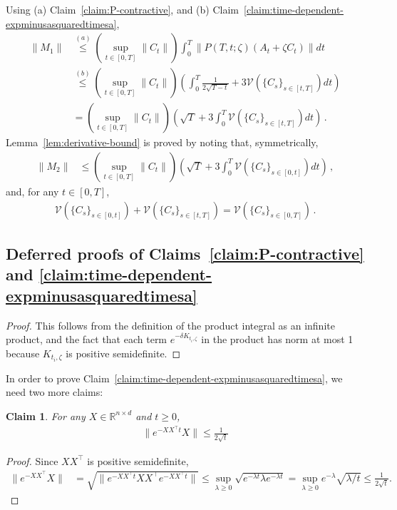 \documentclass[11pt]{article} %
\newcommand{\R}{\mathbb{R}}
\newcommand{\<}{\langle}
\renewcommand{\>}{\rangle}
\newtheorem{claim}{Claim}
\def\cV{{\mathcal V}}
\def\cV{{\mathcal V}}
\def\cV{{\mathcal V}}
\theoremstyle{plain}
\theoremstyle{definition}
\theoremstyle{remark}
\begin{document}
Using (a) Claim~\ref{claim:P-contractive}, and (b) Claim~\ref{claim:time-dependent-expminusasquaredtimesa},
\begin{align}\label{eq:M1-first-bound}
\|M_1\| &\stackrel{(a)}{\leq} (\sup_{t \in [0,T]} \|C_t\|) \int_{0}^T \|P(T,t; \zeta) (A_t +  \zeta  C_t)\| dt\, \\
&\stackrel{(b)}{\leq} (\sup_{t \in [0,T]} \|C_t\|) \left(\int_{0}^T \frac{1}{2\sqrt{T-t}} + 3 \cV(\{C_s\}_{s \in [t,T]}) dt\right) \\
&= (\sup_{t \in [0,T]} \|C_t\|) (\sqrt{T} + 3 \int_{0}^T \cV(\{C_s\}_{s \in [t,T]}) dt)\,.
\end{align}
Lemma~\ref{lem:derivative-bound} is proved by noting that, symmetrically,
\begin{align*}
\|M_2\| &\leq (\sup_{t \in [0,T]} \|C_t\|) (\sqrt{T} + 3 \int_{0}^T \cV(\{C_s\}_{s \in [0,t]}) dt)\,,
\end{align*}
and, for any $t \in [0,T]$,
\begin{align*}
\cV(\{C_s\}_{s \in [0,t]}) + \cV(\{C_s\}_{s \in [t,T]}) = \cV(\{C_s\}_{s \in [0,T]})\,.
\end{align*}

















\subsection{Deferred proofs of Claims~\ref{claim:P-contractive} and \ref{claim:time-dependent-expminusasquaredtimesa}}\label{ssec:technical-ntk}

\claimPcontractive*
\begin{proof}
This follows from the definition of the product integral as an infinite product, and the fact that each term $e^{-\delta K_{t_i,\zeta}}$ in the product has norm at most 1 because $K_{t_i,\zeta}$ is positive semidefinite.
\end{proof}

In order to prove Claim~\ref{claim:time-dependent-expminusasquaredtimesa}, we need two more claims:
\begin{claim}\label{claim:variational-eigenvalue}
For any $X \in \R^{n \times d}$ and $t \geq 0$,
\begin{align*}
\|e^{-XX^{\top}t} X\| \leq\frac{1}{2\sqrt{t}}
\end{align*}
\end{claim}
\begin{proof}
Since $XX^{\top}$ is positive semidefinite,
\begin{align*}
\|e^{-XX^{\top}} X\| &= \sqrt{\|e^{-XX^{\top}t} XX^{\top} e^{-XX^{\top}t}\|} \leq \sup_{\lambda \geq 0} \sqrt{e^{-\lambda t} \lambda e^{-\lambda t}} = \sup_{\lambda \geq 0} e^{-\lambda} \sqrt{\lambda / t} \leq \frac{1}{2\sqrt{t}}.
\end{align*}
\end{proof}
\end{document}
